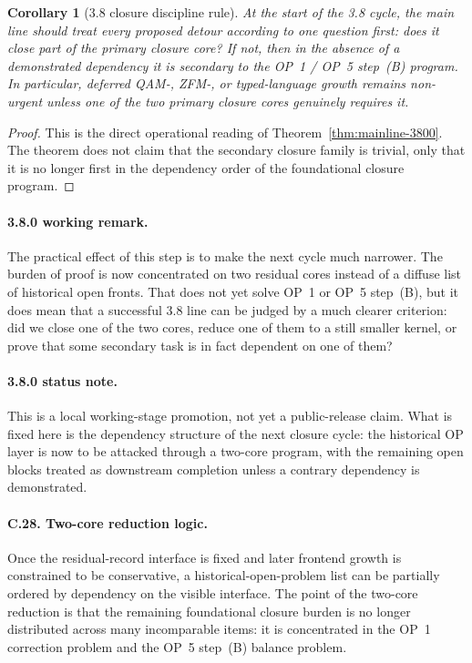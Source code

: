 \documentclass[12pt,a4paper]{article}
\newtheorem{corollary}[theorem]{Corollary}
\begin{document}
\begin{corollary}[3.8 closure discipline rule]
\label{cor:mainline-3800}
At the start of the 3.8 cycle, the main line should treat every proposed detour according to one question first: does it close part of the primary closure core? If not, then in the absence of a demonstrated dependency it is secondary to the OP~1 / OP~5 step~(B) program. In particular, deferred QAM-, ZFM-, or typed-language growth remains non-urgent unless one of the two primary closure cores genuinely requires it.
\end{corollary}

\begin{proof}
This is the direct operational reading of Theorem~\ref{thm:mainline-3800}. The theorem does not claim that the secondary closure family is trivial, only that it is no longer first in the dependency order of the foundational closure program.
\end{proof}

\paragraph{3.8.0 working remark.}
The practical effect of this step is to make the next cycle much narrower. The burden of proof is now concentrated on two residual cores instead of a diffuse list of historical open fronts. That does not yet solve OP~1 or OP~5 step~(B), but it does mean that a successful 3.8 line can be judged by a much clearer criterion: did we close one of the two cores, reduce one of them to a still smaller kernel, or prove that some secondary task is in fact dependent on one of them?

\paragraph{3.8.0 status note.}
This is a local working-stage promotion, not yet a public-release claim. What is fixed here is the dependency structure of the next closure cycle: the historical OP layer is now to be attacked through a two-core program, with the remaining open blocks treated as downstream completion unless a contrary dependency is demonstrated.

\paragraph{C.28. Two-core reduction logic.}
Once the residual-record interface is fixed and later frontend growth is constrained to be conservative, a historical-open-problem list can be partially ordered by dependency on the visible interface. The point of the two-core reduction is that the remaining foundational closure burden is no longer distributed across many incomparable items: it is concentrated in the OP~1 correction problem and the OP~5 step~(B) balance problem.
\end{document}
